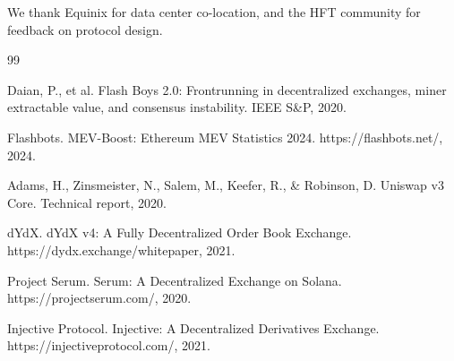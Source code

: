 \documentclass[11pt,letterpaper]{article}
\begin{document}
We thank Equinix for data center co-location, and the HFT community for feedback on protocol design.


\begin{thebibliography}{99}

Daian, P., et al. Flash Boys 2.0: Frontrunning in decentralized exchanges, miner extractable value, and consensus instability. IEEE S\&P, 2020.

Flashbots. MEV-Boost: Ethereum MEV Statistics 2024. https://flashbots.net/, 2024.

Adams, H., Zinsmeister, N., Salem, M., Keefer, R., \& Robinson, D. Uniswap v3 Core. Technical report, 2020.

dYdX. dYdX v4: A Fully Decentralized Order Book Exchange. https://dydx.exchange/whitepaper, 2021.

Project Serum. Serum: A Decentralized Exchange on Solana. https://projectserum.com/, 2020.

Injective Protocol. Injective: A Decentralized Derivatives Exchange. https://injectiveprotocol.com/, 2021.

\end{thebibliography}
\end{document}
